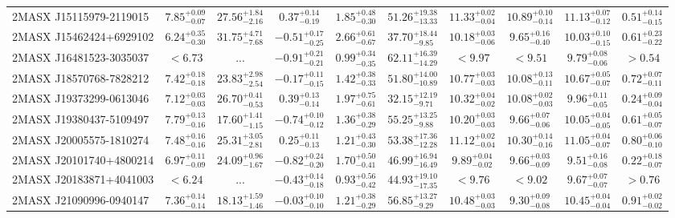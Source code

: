 \documentclass[onecolumn]{mn2e}
\begin{document}
\begin{landscape}
{\begin{center}
\begin{longtable}{lccccccccc}
2MASX J15115979-2119015 & $7.85_{-0.07}^{+0.09}$ & $27.56_{-2.16}^{+1.84}$ & $0.37_{-0.19}^{+0.14}$ & $1.85_{-0.30}^{+0.48}$ &$51.26_{-13.33}^{+19.38}$ & $11.33_{-0.04}^{+0.02}$ & $10.89_{-0.14}^{+0.10}$ & $11.13_{-0.12}^{+0.07}$ & $0.51_{-0.15}^{+0.14}$ \\
2MASX J15462424+6929102 & $6.24_{-0.30}^{+0.35}$ & $31.75_{-7.68}^{+4.71}$ & $-0.51_{-0.25}^{+0.17}$ & $2.66_{-0.67}^{+0.61}$ &$37.70_{-9.85}^{+18.44}$ & $10.18_{-0.06}^{+0.03}$ & $9.65_{-0.40}^{+0.16}$ & $10.03_{-0.15}^{+0.10}$ & $0.61_{-0.22}^{+0.23}$ \\
2MASX J16481523-3035037 & $<6.73$ & ... & $-0.91_{-0.21}^{+0.21}$ & $0.99_{-0.35}^{+0.34}$ &$62.11_{-14.29}^{+16.39}$ & $<9.97$ & $<9.51$ & $9.79_{-0.06}^{+0.08}$ & $>0.54$ \\
2MASX J18570768-7828212 & $7.42_{-0.18}^{+0.18}$ & $23.83_{-2.54}^{+2.98}$ & $-0.17_{-0.15}^{+0.11}$ & $1.42_{-0.33}^{+0.38}$ &$51.80_{-10.89}^{+14.00}$ & $10.77_{-0.03}^{+0.03}$ & $10.08_{-0.11}^{+0.13}$ & $10.67_{-0.07}^{+0.05}$ & $0.72_{-0.11}^{+0.07}$ \\
2MASX J19373299-0613046 & $7.12_{-0.03}^{+0.03}$ & $26.70_{-0.53}^{+0.41}$ & $0.39_{-0.14}^{+0.13}$ & $1.97_{-0.61}^{+0.75}$ &$32.15_{-9.71}^{+12.19}$ & $10.32_{-0.02}^{+0.04}$ & $10.08_{-0.03}^{+0.02}$ & $9.96_{-0.05}^{+0.11}$ & $0.24_{-0.04}^{+0.09}$ \\
2MASX J19380437-5109497 & $7.79_{-0.16}^{+0.13}$ & $17.60_{-1.15}^{+1.41}$ & $-0.74_{-0.12}^{+0.10}$ & $1.36_{-0.29}^{+0.38}$ &$55.25_{-9.88}^{+13.25}$ & $10.20_{-0.03}^{+0.03}$ & $9.66_{-0.06}^{+0.07}$ & $10.05_{-0.05}^{+0.04}$ & $0.61_{-0.07}^{+0.05}$ \\
2MASX J20005575-1810274 & $7.48_{-0.16}^{+0.16}$ & $25.31_{-2.81}^{+3.05}$ & $0.25_{-0.13}^{+0.11}$ & $1.21_{-0.30}^{+0.43}$ &$53.38_{-12.28}^{+17.36}$ & $11.12_{-0.04}^{+0.02}$ & $10.30_{-0.16}^{+0.14}$ & $11.05_{-0.07}^{+0.04}$ & $0.80_{-0.10}^{+0.06}$ \\
2MASX J20101740+4800214 & $6.97_{-0.09}^{+0.11}$ & $24.09_{-1.67}^{+0.96}$ & $-0.82_{-0.20}^{+0.24}$ & $1.70_{-0.41}^{+0.50}$ &$46.99_{-16.49}^{+16.94}$ & $9.89_{-0.02}^{+0.04}$ & $9.66_{-0.09}^{+0.03}$ & $9.51_{-0.08}^{+0.16}$ & $0.22_{-0.07}^{+0.18}$ \\
2MASX J20183871+4041003 & $<6.24$ & ... & $-0.43_{-0.18}^{+0.14}$ & $0.93_{-0.42}^{+0.56}$ &$44.93_{-17.35}^{+19.10}$ & $<9.76$ & $<9.02$ & $9.67_{-0.07}^{+0.07}$ & $>0.76$ \\
2MASX J21090996-0940147 & $7.36_{-0.14}^{+0.14}$ & $18.13_{-1.46}^{+1.59}$ & $-0.03_{-0.10}^{+0.10}$ & $1.21_{-0.29}^{+0.38}$ &$56.85_{-9.29}^{+13.27}$ & $10.48_{-0.03}^{+0.03}$ & $9.30_{-0.08}^{+0.09}$ & $10.45_{-0.04}^{+0.04}$ & $0.91_{-0.02}^{+0.02}$ \\

\end{longtable}
\end{center}}
\end{landscape}
\end{document}
